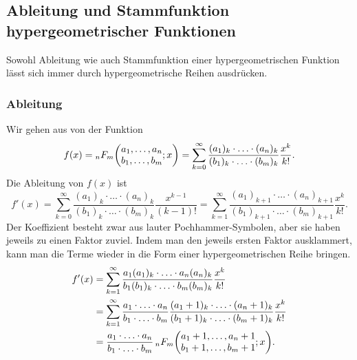 %
%
\subsection{Ableitung und Stammfunktion hypergeometrischer Funktionen
\label{buch:rekursion:hypergeometrisch:stammableitung}}
Sowohl Ableitung wie auch Stammfunktion einer hypergeometrischen
Funktion lässt sich immer durch hypergeometrische Reihen ausdrücken.
%
%
\subsubsection{Ableitung}
%
Wir gehen aus von der Funktion
\begin{equation}
f(x)
=
\mathstrut_nF_m\biggl(
\begin{matrix}a_1,\dots,a_n\\b_1,\dots,b_m\end{matrix};
x\biggr)
=
\sum_{k=0}^\infty
\frac{
(a_1)_k\cdot\ldots\cdot(a_n)_k
}{
(b_1)_k\cdot\ldots\cdot(b_m)_k
}
\frac{x^k}{k!}.
\label{buch:rekursion:hypergeometrisch:eqn:f}
\end{equation}
Die Ableitung von $f(x)$ ist
\[
f'(x)
=
\sum_{k=0}^\infty
\frac{
(a_1)_k\cdot\ldots\cdot(a_n)_k
}{
(b_1)_k\cdot\ldots\cdot(b_m)_k
}
\frac{x^{k-1}}{(k-1)!}
=
\sum_{k=1}^\infty
\frac{
(a_1)_{k+1}\cdot\ldots\cdot(a_n)_{k+1}
}{
(b_1)_{k+1}\cdot\ldots\cdot(b_m)_{k+1}
}
\frac{x^k}{k!}.
\]
Der Koeffizient besteht zwar aus lauter Pochhammer-Symbolen, aber sie
haben jeweils zu einen Faktor zuviel.
Indem man den jeweils ersten Faktor ausklammert, kann man die
Terme wieder in die Form einer hypergeometrischen Reihe bringen.
\begin{align*}
f'(x)
&=
\sum_{k=1}^\infty
\frac{
a_1(a_1)_{k}\cdot\ldots\cdot a_n(a_n)_{k}
}{
b_1(b_1)_{k}\cdot\ldots\cdot b_m(b_m)_{k}
}
\frac{x^k}{k!}
\\
&=
\sum_{k=1}^\infty
\frac{
a_1\cdot\ldots\cdot a_n
}{
b_1\cdot\ldots\cdot b_m
}
\frac{
(a_1+1)_{k}\cdot\ldots\cdot(a_n+1)_{k}
}{
(b_1+1)_{k}\cdot\ldots\cdot(b_m+1)_{k}
}
\frac{x^k}{k!}
\\
&=
\frac{
a_1\cdot\ldots\cdot a_n
}{
b_1\cdot\ldots\cdot b_m
}
\,
\mathstrut_nF_m\biggl(
\begin{matrix}a_1+1,\dots,a_n+1\\b_1+1,\dots,b_m+1\end{matrix};
x\biggr).
\end{align*}

